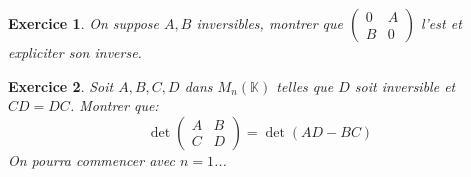 \documentclass[12pt,a4paper]{article}
\newcommand{\K}{\mathbb{K} }
\theoremstyle{break}
\theoremstyle{break}
\newtheorem{Exo}{Exercice}
\begin{document}
\begin{Exo}
	On suppose $A,B$ inversibles, montrer que $\begin{pmatrix}
		0 & A \\
		B & 0
	\end{pmatrix}$ l'est et expliciter son inverse.
\end{Exo}

\begin{Exo}
	Soit $A,B,C,D$ dans $M_n(\K)$ telles que $D$ soit inversible et $CD=DC$. Montrer que:
	\[\det\begin{pmatrix}
		A & B \\
		C & D
	\end{pmatrix}=\det(AD-BC)
	\]
	On pourra commencer avec $n=1$...
\end{Exo}
\end{document}
